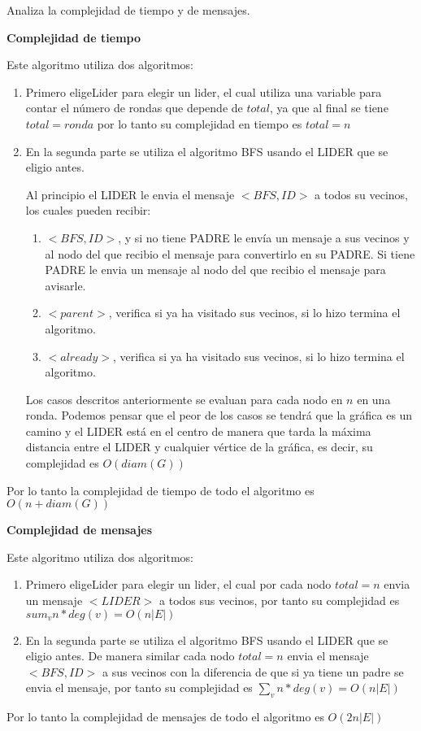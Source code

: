 Analiza la complejidad de tiempo y de mensajes.

\textbf{Complejidad de tiempo}

Este algoritmo utiliza dos algoritmos:
\begin{enumerate}
    \item Primero eligeLider para elegir un lider, el cual utiliza una variable para contar el número de rondas que depende de $total$, ya que al final se tiene $total=ronda$ por lo tanto su complejidad en tiempo es $total=n$ 

    \item En la segunda parte se utiliza el algoritmo BFS usando el LIDER que se eligio antes. 

    Al principio el LIDER le envia el mensaje $<BFS,ID>$ a todos su vecinos, los cuales pueden recibir:
    \begin{enumerate}
        \item $<BFS,ID>$, y si no tiene PADRE le envía un mensaje a sus vecinos y al nodo del que recibio el mensaje para convertirlo en su PADRE. Si tiene PADRE le envia un mensaje al nodo del que recibio el mensaje para avisarle.
        \item $<parent>$, verifica si ya ha visitado sus vecinos, si lo hizo termina el algoritmo.
        \item $<already>$, verifica si ya ha visitado sus vecinos, si lo hizo termina el algoritmo.
    \end{enumerate}
    Los casos descritos anteriormente se evaluan para cada nodo en $n$ en una ronda. Podemos pensar que el peor de los casos se tendrá que la gráfica es un camino y el LIDER está en el centro de manera que tarda la máxima distancia entre el LIDER y cualquier vértice de la gráfica, es decir, su complejidad es $O(diam(G))$
\end{enumerate} 

Por lo tanto la complejidad de tiempo de todo el algoritmo es $O(n+diam(G))$


\textbf{Complejidad de mensajes}

Este algoritmo utiliza dos algoritmos:
\begin{enumerate}
    \item Primero eligeLider para elegir un lider, el cual por cada nodo $total=n$ envia un mensaje $<LIDER>$ a todos sus vecinos, por tanto su complejidad es $sum_v n * deg(v) = O(n|E|)$
    \item En la segunda parte se utiliza el algoritmo BFS usando el LIDER que se eligio antes. De manera similar cada nodo $total=n$ envia el mensaje $<BFS,ID>$ a sus vecinos con la diferencia de que si ya tiene un padre se envia el mensaje, por tanto su complejidad es $\sum_v n * deg(v) = O(n|E|)$
\end{enumerate}

Por lo tanto la complejidad de mensajes de todo el algoritmo es $O(2n|E|)$
